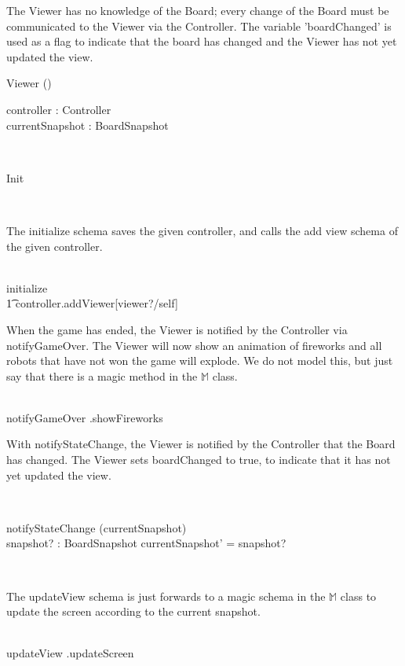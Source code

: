 \documentclass[12pt]{article}
\begin{document}
The Viewer has no knowledge of the Board; every change of the Board must be communicated to the Viewer via the Controller. The variable 'boardChanged' is used as a flag to indicate that the board has changed and the Viewer has not yet updated the view.
\begin{class}{Viewer}
\upharpoonright () \\
\begin{state}
controller : Controller \\
currentSnapshot : BoardSnapshot \\
\end{state}\\
\begin{schema}{Init}
\end{schema}\\
\begin{zpar}
The initialize schema saves the given controller, and calls the add view schema of the given controller.
\end{zpar} \\
initialize \sdef [\Delta(controller), c? : Controller | controller' = c] \;\; \comp \\ \t1 controller.addViewer[viewer?/self] \\
\begin{zpar}
When the game has ended, the Viewer is notified by the Controller via notifyGameOver. The Viewer will now show an animation of fireworks and all robots that have not won the game will explode. We do not model this, but just say that there is a magic method in the $\mathbb{M}$ class.
\end{zpar} \\
notifyGameOver \sdef {}.showFireworks \\
\begin{zpar}
With notifyStateChange, the Viewer is notified by the Controller that the Board has changed. The Viewer sets boardChanged to true, to indicate that it has not yet updated the view.
\end{zpar} \\
\begin{schema}{notifyStateChange}
\Delta (currentSnapshot) \\
snapshot? : BoardSnapshot
\where
currentSnapshot' = snapshot?
\end{schema}\\
\znewpage
\begin{zpar}
The updateView schema is just forwards to a magic schema in the $\mathbb{M}$ class to update the screen according to the current snapshot.
\end{zpar} \\
updateView \sdef {}.updateScreen
\end{class}
\end{document}
